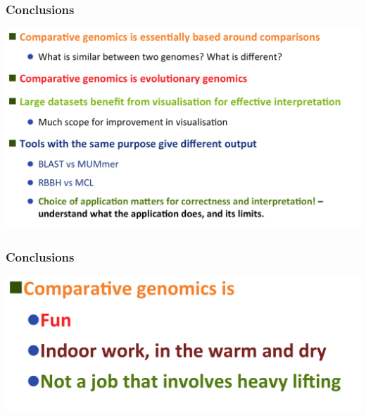 \begin{frame}
  \frametitle{Conclusions}
  \begin{center}
      \includegraphics[width=1\textwidth]{images/conclusions2} 
  \end{center}
\end{frame}

\begin{frame}
  \frametitle{Conclusions}
  \begin{center}
      \includegraphics[width=1\textwidth]{images/conclusions3} 
  \end{center}
\end{frame}
